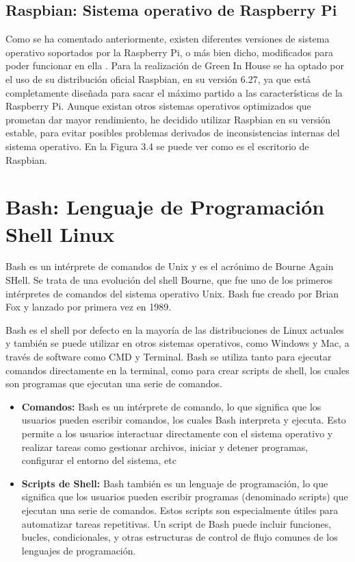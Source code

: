     \subsection{Raspbian: Sistema operativo de Raspberry Pi}
    Como se ha comentado anteriormente, existen diferentes versiones de sistema operativo soportados por la Raspberry Pi, o más bien dicho, modificados para poder funcionar en ella \cite{download:raspbian}. Para la realización de Green In House se ha optado por el uso de su distribución oficial Raspbian, en su versión 6.27, ya que está completamente diseñada para sacar el máximo partido a las características de la Raspberry Pi. Aunque existan otros sistemas operativos optimizados que prometan dar mayor rendimiento, he decidido utilizar Raspbian en su versión estable, para evitar posibles problemas derivados de inconsistencias internas del sistema operativo. En la Figura 3.4 se puede ver como es el escritorio de Raspbian.

\section{Bash: Lenguaje de Programación Shell Linux}
Bash \cite{wiki:bash} es un intérprete de comandos de Unix y es el acrónimo de Bourne Again SHell. Se trata de una evolución del shell Bourne, que fue uno de los primeros intérpretes de comandos del sistema operativo Unix. Bash fue creado por Brian Fox y lanzado por primera vez en 1989. 

Bash es el shell por defecto en la mayoría de las distribuciones de Linux actuales y también se puede utilizar en otros sistemas operativos, como Windows y Mac, a través de software como CMD y Terminal. Bash se utiliza tanto para ejecutar comandos directamente en la terminal, como para crear scripts de shell, los cuales son programas que ejecutan una serie de comandos.

\begin{itemize}
    \item \textbf{Comandos:} Bash es un intérprete de comando, lo que significa que los usuarios pueden escribir comandos, los cuales Bash interpreta y ejecuta. Esto permite a los usuarios interactuar directamente con el sistema operativo y realizar tareas como gestionar archivos, iniciar y detener programas, configurar el entorno del sistema, etc
    \item \textbf{Scripts de Shell:} Bash también es un lenguaje de programación, lo que significa que los usuarios pueden escribir programas (denominado scripts) que ejecutan una serie de comandos. Estos scripts son especialmente útiles para automatizar tareas repetitivas. Un script de Bash puede incluir funciones, bucles, condicionales, y otras estructuras de control de flujo comunes de los lenguajes de programación.   
\end{itemize}
